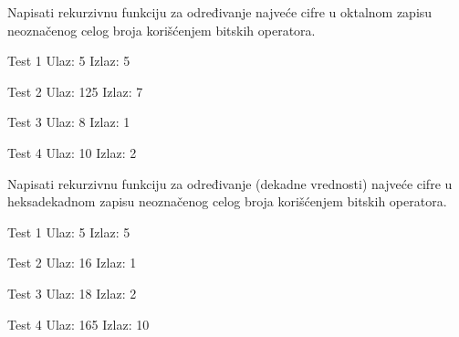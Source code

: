 \begin{Exercise}[label=119]
Napisati rekurzivnu funkciju za određivanje
najveće cifre u oktalnom zapisu
neoznačenog celog broja korišćenjem bitskih operatora.

\begin{minitest}
\begin{test}{Test 1}
Ulaz:  5
Izlaz: 5
\end{test}
\end{minitest}
\begin{minitest}
\begin{test}{Test 2}
Ulaz:  125
Izlaz: 7
\end{test}
\end{minitest}

\begin{minitest}
\begin{test}{Test 3}
Ulaz:  8
Izlaz: 1
\end{test}
\end{minitest}
\begin{minitest}
\begin{test}{Test 4}
Ulaz:  10
Izlaz: 2
\end{test}
\end{minitest}

\end{Exercise}
\begin{Answer}[ref=119]
\end{Answer}

\begin{Exercise}[label=120]
Napisati rekurzivnu funkciju za određivanje (dekadne vrednosti)
najveće cifre u heksadekadnom zapisu neoznačenog celog broja
korišćenjem bitskih operatora. 

\begin{minitest}
\begin{test}{Test 1}
Ulaz:  5
Izlaz: 5
\end{test}
\end{minitest}
\begin{minitest}
\begin{test}{Test 2}
Ulaz:  16
Izlaz: 1
\end{test}
\end{minitest}
\begin{minitest}
\begin{test}{Test 3}
Ulaz:  18
Izlaz: 2
\end{test}
\end{minitest}

\begin{minitest}
\begin{test}{Test 4}
Ulaz:  165
Izlaz: 10
\end{test}
\end{minitest}

\end{Exercise}
\begin{Answer}[ref=120]
\end{Answer}

